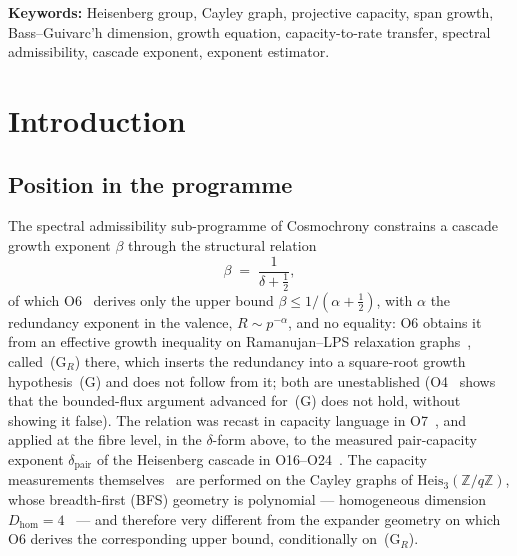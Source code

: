 \documentclass[11pt,a4paper]{article}
\theoremstyle{definition}
\newcommand{\Heisq}{\mathrm{Heis}_3(\mathbb{Z}/q\mathbb{Z})}
\newcommand{\dc}{\delta_c}
\newcommand{\Dhom}{D_{\mathrm{hom}}}
\begin{document}
\begin{abstract}
by a computable $8$--$13\%$ on the production windows.
Window-effective exponents make contact near $q = 211$ and separate strictly for $q \ge 307$; the contact
is transitional in the accessible data and the asymptotic value of $\dc$ remains open.
\medskip
\noindent\textbf{Interpretive status.}
The classification and the no-go are proved under explicit, separately stated hypotheses; the numerical
exponents are finite-window measurements; nothing here modifies a capacity measurement.
As a structural reading, span growth on an emergent substrate is a competition between geometric opening
(volume growth) and novelty exhaustion (capacity decay), and a conversion law between the two is a property
of the substrate's geometry, not of the cascade alone: changing the geometry changes the law.
This reading is an interpretation, not a result.
\end{abstract}

\medskip
\noindent\textbf{Keywords:} Heisenberg group, Cayley graph, projective capacity, span growth,
Bass--Guivarc'h dimension, growth equation, capacity-to-rate transfer, spectral admissibility,
cascade exponent, exponent estimator.

\newpage
\tableofcontents

\newpage
\section{Introduction}
\label{sec:intro}

\subsection{Position in the programme}
\label{ssec:position}

The spectral admissibility sub-programme of Cosmochrony constrains a cascade growth exponent $\beta$ through
the structural relation
\begin{equation}
  \label{eq:lps-law}
  \beta \;=\; \frac{1}{\delta + \tfrac{1}{2}},
\end{equation}
of which O6~\cite{Beau2026a10} derives only the upper bound $\beta \le 1/(\alpha + \tfrac{1}{2})$, with
$\alpha$ the redundancy exponent in the valence, $R \sim p^{-\alpha}$, and no equality: O6 obtains it from an
effective growth inequality on Ramanujan--LPS relaxation graphs~\cite{LPS88}, called~(G$_R$) there, which
inserts the redundancy into a square-root growth hypothesis~(G) and does not follow from it; both are
unestablished (O4~\cite{Beau2026a8} shows that the bounded-flux argument advanced for~(G) does not hold,
without showing it false).
The relation was recast in capacity language in
O7~\cite{Beau2026a11}, and applied at the fibre level, in the $\delta$-form above, to the measured
pair-capacity exponent $\delta_{\mathrm{pair}}$ of the Heisenberg cascade in
O16--O24~\cite{Beau2026a20,Beau2026a25,Beau2026a26,Beau2026a27,Beau2026a28}.
The capacity measurements themselves~\cite{Beau2026a16,Beau2026a29} are performed on the Cayley graphs of
$\Heisq$, whose breadth-first (BFS) geometry is polynomial --- homogeneous dimension
$\Dhom = 4$~\cite{Bass1972,Guivarch1973} --- and therefore very different from the expander geometry on which
O6 derives the corresponding upper bound, conditionally on~(G$_R$).
\end{document}
